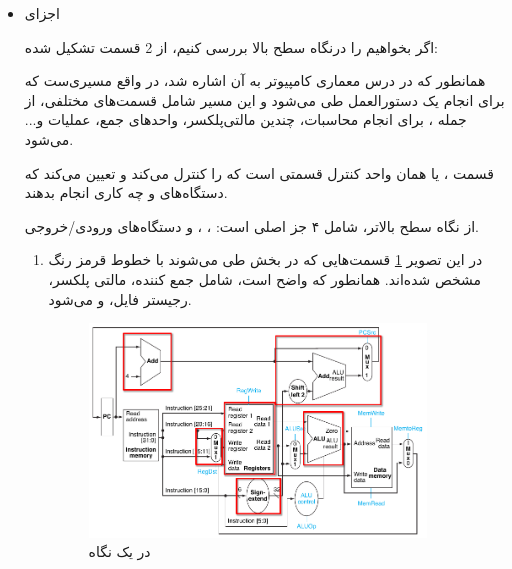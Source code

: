 \documentclass[11pt, twoside]{imsproc}
\begin{document}
\begin{itemize}
\item اجزای 

اگر بخواهیم  را درنگاه سطح بالا بررسی کنیم،  از 2 قسمت تشکیل شده:

همانطور که در درس معماری کامپیوتر به آن اشاره شد،  در واقع مسیری‌ست که برای انجام یک دستورالعمل طی می‌شود و این مسیر شامل قسمت‌های مختلفی، از جمله
،
برای انجام محاسبات، چندین مالتی‌پلکسر، واحدهای جمع، عملیات  و... می‌شود.

قسمت ، یا همان واحد کنترل قسمتی است که  را کنترل می‌کند و تعیین می‌کند که  دستگاه‌های  و  چه کاری انجام بدهند.

از نگاه سطح بالاتر،  شامل ۴ جز اصلی است:
،
،
و دستگاه‌های ورودی/خروجی.

\begin{enumerate}
\item {}

در این تصویر
\ref{fig:datapath-red}
قسمت‌هایی که در بخش  طی می‌شوند با خطوط قرمز رنگ مشخص شده‌اند. همانطور که واضح است،  شامل جمع کننده، مالتی پلکسر، رجیستر فایل،  و  می‌شود.

\begin{figure}[H]
\begin{center}
\includegraphics*[width=0.9\textwidth, height=0.55\textheight]{images/datapath-red}
\end{center}
\caption{\small{ در یک نگاه}}
\label{fig:datapath-red}
\end{figure}


\end{enumerate}
\end{itemize}
\end{document}
